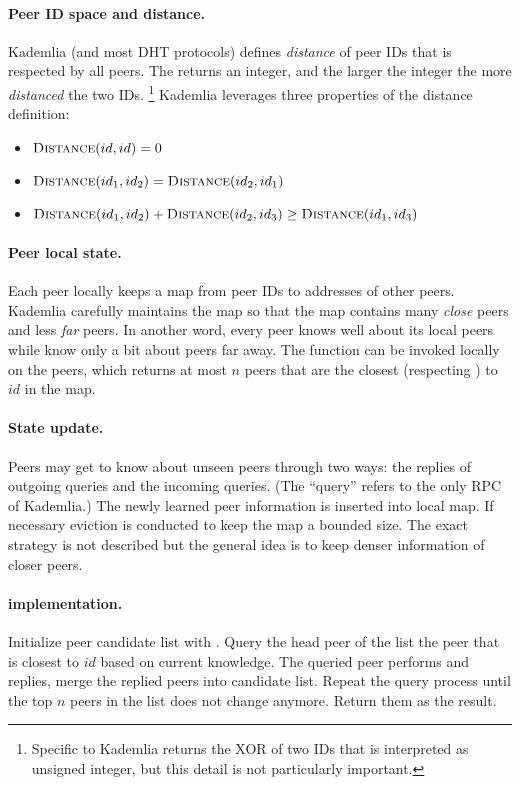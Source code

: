 \paragraph{Peer ID space and distance.}
Kademlia (and most DHT protocols) defines \emph{distance} of peer IDs that is respected by all peers.
The \dist[$id_1$, $id_2$] returns an integer, and the larger the integer the more \emph{distanced} the two IDs.
\footnote{Specific to Kademlia \dist returns the XOR of two IDs that is interpreted as unsigned integer, but this detail is not particularly important.}
Kademlia leverages three properties of the distance definition:
\begin{itemize}
    \item $\dist[id, id] = 0$
    \item $\dist[id_1, id_2] = \dist[id_2, id_1]$
    \item $\dist[id_1, id_2] + \dist[id_2, id_3] \geq \dist[id_1, id_3]$
\end{itemize}

\paragraph{Peer local state.}
Each peer locally keeps a map from peer IDs to addresses of other peers.
Kademlia carefully maintains the map so that the map contains many \emph{close} peers and less \emph{far} peers.
In another word, every peer knows well about its local peers while know only a bit about peers far away.
The function \lfind[$id$, $n$] can be invoked locally on the peers, which returns at most $n$ peers that are the closest (respecting \dist) to $id$ in the map.

\paragraph{State update.}
Peers may get to know about unseen peers through two ways: the replies of outgoing queries and the incoming queries.
(The ``query'' refers to the only RPC of Kademlia.)
The newly learned peer information is inserted into local map.
If necessary eviction is conducted to keep the map a bounded size.
The exact strategy is not described but the general idea is to keep denser information of closer peers.

\paragraph{\find[$id$, $n$] implementation.}
Initialize peer candidate list with \lfind[$id$, $n$].
Query the head peer of the list \ie the peer that is closest to $id$ based on current knowledge.
The queried peer performs \lfind[$id$, $n$] and replies, merge the replied peers into candidate list.
Repeat the query process until the top $n$ peers in the list does not change anymore.
Return them as the \find result.

